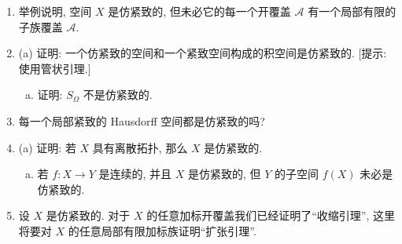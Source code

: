 \documentclass[../../main.tex]{subfiles}
\begin{document}
\begin{enumerate}
\item 举例说明, 空间 $X$ 是仿紧致的, 但未必它的每一个开覆盖 $\mathcal{A}$ 有一个局部有限的子族覆盖 $\mathcal{A}$.
\item (a) 证明: 一个仿紧致的空间和一个紧致空间构成的积空间是仿紧致的. [提示: 使用管状引理.]
\begin{enumerate}[(b)]
\item 证明: $S_\Omega$ 不是仿紧致的.
\end{enumerate}
\item 每一个局部紧致的 Hausdorff 空间都是仿紧致的吗?
\item (a) 证明: 若 $X$ 具有离散拓扑, 那么 $X$ 是仿紧致的.
\begin{enumerate}[(b)]
\item 若 $f\colon X\to Y$ 是连续的, 并且 $X$ 是仿紧致的, 但 $Y$ 的子空间 $f(X)$ 未必是仿紧致的.
\end{enumerate}
\item 设 $X$ 是仿紧致的. 对于 $X$ 的任意加标开覆盖我们已经证明了``收缩引理'', 这里将要对 $X$ 的任意局部有限加标族证明``扩张引理''.


\end{enumerate}
\end{document}
